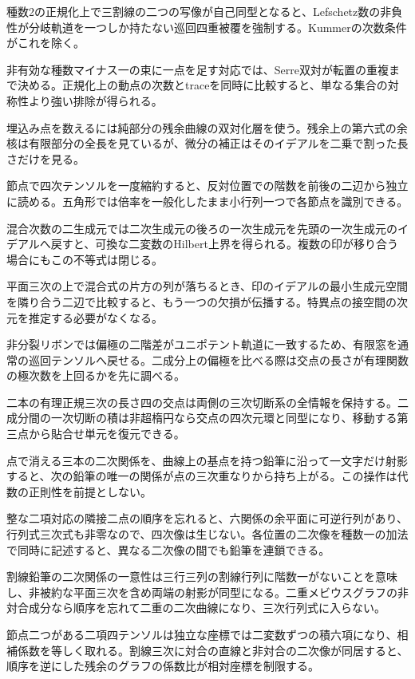 \documentclass[11pt,a4paper]{ltjsarticle}
\begin{document}
種数2の正規化上で三割線の二つの写像が自己同型となると、Lefschetz数の非負性が分岐軌道を一つしか持たない巡回四重被覆を強制する。Kummerの次数条件がこれを除く。

非有効な種数マイナス一の束に一点を足す対応では、Serre双対が転置の重複まで決める。正規化上の動点の次数とtraceを同時に比較すると、単なる集合の対称性より強い排除が得られる。

埋込み点を数えるには純部分の残余曲線の双対化層を使う。残余上の第六式の余核は有限部分の全長を見ているが、微分の補正はそのイデアルを二乗で割った長さだけを見る。

節点で四次テンソルを一度縮約すると、反対位置での階数を前後の二辺から独立に読める。五角形では倍率を一般化したまま小行列一つで各節点を識別できる。

混合次数の二生成元では二次生成元の後ろの一次生成元を先頭の一次生成元のイデアルへ戻すと、可換な二変数のHilbert上界を得られる。複数の印が移り合う場合にもこの不等式は閉じる。

平面三次の上で混合式の片方の列が落ちるとき、印のイデアルの最小生成元空間を隣り合う二辺で比較すると、もう一つの欠損が伝播する。特異点の接空間の次元を推定する必要がなくなる。

非分裂リボンでは偏極の二階差がユニポテント軌道に一致するため、有限窓を通常の巡回テンソルへ戻せる。二成分上の偏極を比べる際は交点の長さが有理関数の極次数を上回るかを先に調べる。

二本の有理正規三次の長さ四の交点は両側の三次切断系の全情報を保持する。二成分間の一次切断の積は非超楕円なら交点の四次元環と同型になり、移動する第三点から貼合せ単元を復元できる。

点で消える三本の二次関係を、曲線上の基点を持つ鉛筆に沿って一文字だけ射影すると、次の鉛筆の唯一の関係が点の三次重なりから持ち上がる。この操作は代数の正則性を前提としない。

整な二項対応の隣接二点の順序を忘れると、六関係の余平面に可逆行列があり、行列式三次式も非零なので、四次像は生じない。各位置の二次像を種数一の加法で同時に記述すると、異なる二次像の間でも鉛筆を連鎖できる。

割線鉛筆の二次関係の一意性は三行三列の割線行列に階数一がないことを意味し、非被約な平面三次を含め両端の射影が同型になる。二重メビウスグラフの非対合成分なら順序を忘れて二重の二次曲線になり、三次行列式に入らない。

節点二つがある二項四テンソルは独立な座標では二変数ずつの積六項になり、相補係数を等しく取れる。割線三次に対合の直線と非対合の二次像が同居すると、順序を逆にした残余のグラフの係数比が相対座標を制限する。
\end{document}
